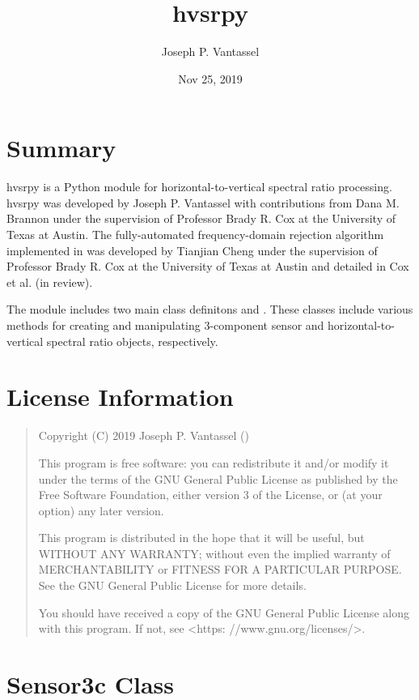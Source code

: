 \documentclass[letterpaper,10pt,english,openany,oneside]{sphinxmanual}
\title{hvsrpy}
\date{Nov 25, 2019}
\author{Joseph P.\@{} Vantassel}
\begin{document}
\pagestyle{empty}
\sphinxmaketitle
\pagestyle{plain}
\sphinxtableofcontents
\pagestyle{normal}
\label{\detokenize{index::doc}}



\chapter{Summary}
\label{\detokenize{index:summary}}
hvsrpy is a Python module for horizontal-to-vertical spectral ratio
processing. hvsrpy was developed by Joseph P. Vantassel with contributions
from Dana M. Brannon under the supervision of Professor Brady R. Cox at the
University of Texas at Austin. The fully-automated frequency-domain rejection
algorithm implemented in  was developed by Tianjian Cheng under the
supervision of Professor Brady R. Cox at the University of Texas at Austin and
detailed in Cox et al. (in review).

The module includes two main class definitons  and . These
classes include various methods for creating and manipulating 3-component
sensor and horizontal-to-vertical spectral ratio objects, respectively.


\chapter{License Information}
\label{\detokenize{index:license-information}}\begin{quote}

Copyright (C) 2019 Joseph P. Vantassel ()

This program is free software: you can redistribute it and/or modify
it under the terms of the GNU General Public License as published by
the Free Software Foundation, either version 3 of the License, or
(at your option) any later version.

This program is distributed in the hope that it will be useful,
but WITHOUT ANY WARRANTY; without even the implied warranty of
MERCHANTABILITY or FITNESS FOR A PARTICULAR PURPOSE.  See the
GNU General Public License for more details.

You should have received a copy of the GNU General Public License
along with this program.  If not, see \textless{}https: //www.gnu.org/licenses/\textgreater{}.
\end{quote}


\chapter{Sensor3c Class}
\label{\detokenize{index:sensor3c-class}}
\end{document}
